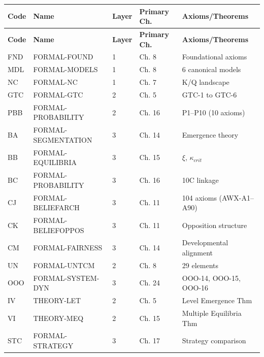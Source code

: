 \begin{tcolorbox}[colback=green!3!white, colframe=green!60!black,
    title=\textbf{All 17 FORMAL Appendices}]

\small
\begin{longtable}{|l|l|l|l|l|}
\hline
\textbf{Code} & \textbf{Name} & \textbf{Layer} & \textbf{Primary Ch.} & \textbf{Axioms/Theorems} \\
\hline
\hline
\endfirsthead
\hline
\textbf{Code} & \textbf{Name} & \textbf{Layer} & \textbf{Primary Ch.} & \textbf{Axioms/Theorems} \\
\hline
\endhead
FND & FORMAL-FOUND & 1 & Ch. 8 & Foundational axioms \\
MDL & FORMAL-MODELS & 1 & Ch. 8 & 6 canonical models \\
NC & FORMAL-NC & 1 & Ch. 7 & K/Q landscape \\
\hline
GTC & FORMAL-GTC & 2 & Ch. 5 & GTC-1 to GTC-6 \\
PBB & FORMAL-PROBABILITY & 2 & Ch. 16 & P1--P10 (10 axioms) \\
\hline
BA & FORMAL-SEGMENTATION & 3 & Ch. 14 & Emergence theory \\
BB & FORMAL-EQUILIBRIA & 3 & Ch. 15 & $\xi$, $\kappa_{crit}$ \\
BC & FORMAL-PROBABILITY & 3 & Ch. 16 & 10C linkage \\
\hline
CJ & FORMAL-BELIEFARCH & 3 & Ch. 11 & 104 axioms (AWX-A1--A90) \\
CK & FORMAL-BELIEFOPPOS & 3 & Ch. 11 & Opposition structure \\
CM & FORMAL-FAIRNESS & 3 & Ch. 14 & Developmental alignment \\
\hline
UN & FORMAL-UNTCM & 2 & Ch. 8 & 29 elements \\
OOO & FORMAL-SYSTEM-DYN & 3 & Ch. 24 & OOO-14, OOO-15, OOO-16 \\
\hline
IV & THEORY-LET & 2 & Ch. 5 & Level Emergence Thm \\
VI & THEORY-MEQ & 2 & Ch. 15 & Multiple Equilibria Thm \\
STC & FORMAL-STRATEGY & 3 & Ch. 17 & Strategy comparison \\
\hline
\end{longtable}

\end{tcolorbox}

